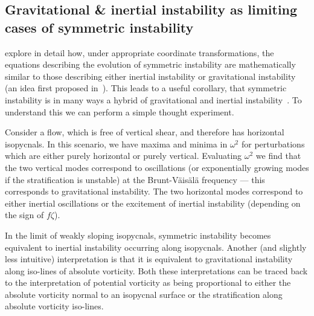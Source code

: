     \subsection{Gravitational \& inertial instability as limiting cases of symmetric instability}
    \label{sec:Xu}
    \citet{Xu1985} explore in detail how, under appropriate coordinate transformations, the equations describing the evolution of symmetric instability are mathematically similar to those describing either inertial instability or gravitational instability (an idea first proposed in~\citet{Hoskins1974}). This leads to a useful corollary, that symmetric instability is in many ways a hybrid of gravitational and inertial instability~\citep[e.g.][]{Haine1998}. To understand this we can perform a simple thought experiment.

    Consider a flow, which is free of vertical shear, and therefore has horizontal isopycnals. In this scenario, we have maxima and minima in $\omega^2$ for perturbations which are either purely horizontal or purely vertical. Evaluating $\omega^2$ we find that the two vertical modes correspond to oscillations (or exponentially growing modes if the stratification is unstable) at the Brunt-V\"ais\"al\"a frequency --- this corresponds to gravitational instability. The two horizontal modes correspond to either inertial oscillations or the excitement of inertial instability (depending on the sign of $f \zeta$).

    In the limit of weakly sloping isopycnals, symmetric instability becomes equivalent to inertial instability occurring along isopycnals. Another (and slightly less intuitive) interpretation is that it is equivalent to gravitational instability along iso-lines of absolute vorticity. Both these interpretations can be traced back to the interpretation of potential vorticity as being proportional to either the absolute vorticity normal to an isopycnal surface or the stratification along absolute vorticity iso-lines.
    
